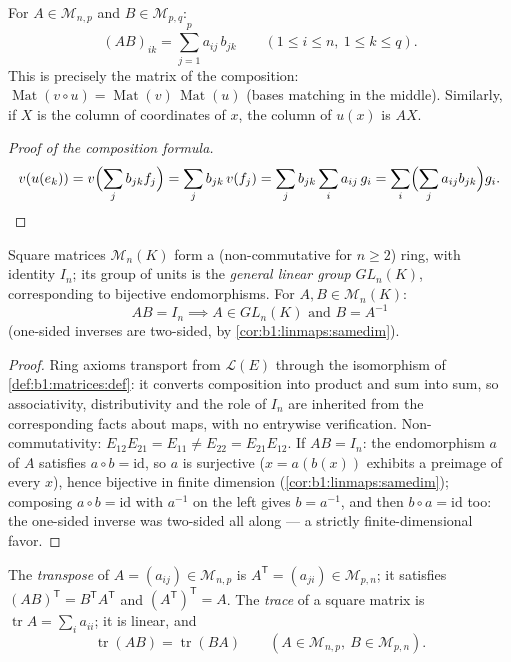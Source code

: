 \begin{definition}[Product]\label{def:b1:matrices:product}
For $A \in \mathcal{M}_{n,p}$ and $B \in \mathcal{M}_{p,q}$:
\[
(AB)_{ik} = \sum_{j=1}^{p} a_{ij}\, b_{jk}
\qquad (1 \leq i \leq n,\ 1 \leq k \leq q).
\]
This is precisely the matrix of the composition:
$\operatorname{Mat}(v \circ u) = \operatorname{Mat}(v)\,
\operatorname{Mat}(u)$ (bases matching in the middle). Similarly,
if $X$ is the column of coordinates of $x$, the column of $u(x)$ is
$AX$.
\end{definition}

\begin{proof}[Proof of the composition formula]
\[
v(u(e_k)) = v\Bigl(\sum_j b_{jk} f_j\Bigr) = \sum_j b_{jk}\, v(f_j)
= \sum_j b_{jk} \sum_i a_{ij}\, g_i
= \sum_i \Bigl(\sum_j a_{ij} b_{jk}\Bigr) g_i . \qedhere
\]
\end{proof}

\begin{proposition}\label{prop:b1:matrices:ring}
Square matrices $\mathcal{M}_n(K)$ form a (non-commutative for $n
\geq 2$) ring, with identity $I_n$; its group of units is the
\emph{general linear group}
$GL_n(K)$, corresponding to bijective endomorphisms. For $A, B \in
\mathcal{M}_n(K)$:
\[
AB = I_n \implies A \in GL_n(K) \text{ and } B = A^{-1}
\]
(one-sided inverses are two-sided, by
\cref{cor:b1:linmaps:samedim}).
\end{proposition}

\begin{proof}
Ring axioms transport from $\mathcal{L}(E)$ through the
isomorphism of \cref{def:b1:matrices:def}: it converts
composition into product and sum into sum, so associativity,
distributivity and the role of $I_n$ are inherited from the
corresponding facts about maps, with no entrywise verification.
Non-commutativity: $E_{12}E_{21} = E_{11} \neq E_{22}
= E_{21}E_{12}$. If $AB = I_n$: the endomorphism $a$ of $A$
satisfies $a \circ b = \mathrm{id}$, so $a$ is surjective ($x =
a(b(x))$ exhibits a preimage of every $x$), hence bijective in
finite dimension (\cref{cor:b1:linmaps:samedim}); composing $a
\circ b = \mathrm{id}$ with $a^{-1}$ on the left gives $b =
a^{-1}$, and then $b\circ a = \mathrm{id}$ too: the one-sided
inverse was two-sided all along --- a strictly
finite-dimensional favor.
\end{proof}

\begin{definition}\label{def:b1:matrices:transpose}
The \emph{transpose} of $A = (a_{ij}) \in \mathcal{M}_{n,p}$ is $A^{\mathsf T}
= (a_{ji}) \in \mathcal{M}_{p,n}$; it satisfies $(AB)^{\mathsf T} = B^{\mathsf T}
A^{\mathsf T}$ and $(A^{\mathsf T})^{\mathsf T} = A$. The
\emph{trace} of a square matrix is $\operatorname{tr} A
= \sum_i a_{ii}$; it is linear, and
\[
\operatorname{tr}(AB) = \operatorname{tr}(BA)
\qquad (A \in \mathcal{M}_{n,p},\ B \in \mathcal{M}_{p,n}).
\]
\end{definition}

